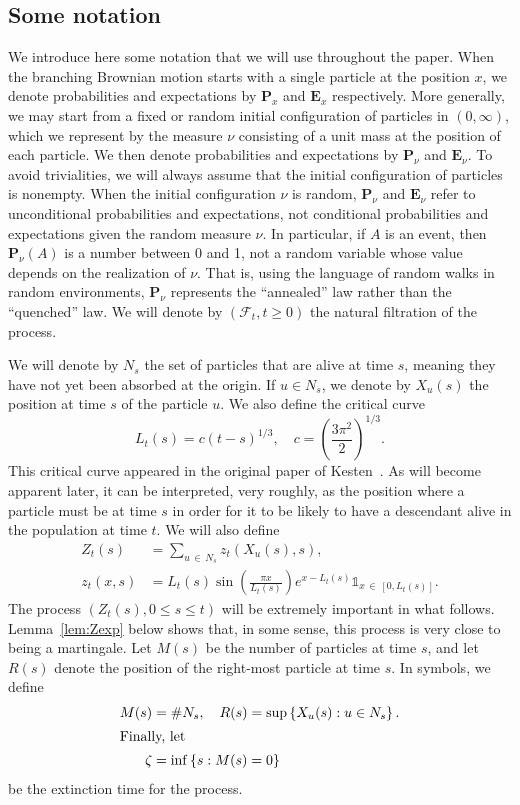 \documentclass[AHL,Unicode,longabstracts,published]{cedram}
\newcommand*\E{\mathbf{E}}
\renewcommand*\P{\mathbf{P}}
\newcommand\F{\mathcal{F}}
\newcommand{\1} {\mathds{1}}
\begin{document}
\subsection{Some notation}

We introduce here some notation that we will use throughout the paper. When the branching Brownian motion starts with a single particle at the position $x$, we denote probabilities and expectations by $\P_x$ and $\E_x$ respectively. More generally, we may start from a fixed or random initial configuration of particles in $(0, \infty)$, which we represent by the measure $\nu$ consisting of a unit mass at the position of each particle. We then denote probabilities and expectations by $\P_{\nu}$ and $\E_{\nu}$. To avoid trivialities, we will always assume that the initial configuration of particles is nonempty. When the initial configuration $\nu$ is random, $\P_{\nu}$ and $\E_{\nu}$ refer to unconditional probabilities and expectations, not conditional probabilities and expectations given the random measure $\nu$. In particular, if $A$ is an event, then $\P_{\nu}(A)$ is a number between 0 and 1, not a random variable whose value depends on the realization of $\nu$. That is, using the language of random walks in random environments, $\P_{\nu}$ represents the ``annealed'' law rather than the ``quenched'' law. We will denote by $(\F_t, t \geq 0)$ the natural filtration of the process.

We will denote by $N_s$ the set of particles that are alive at time $s$, meaning they have not yet been absorbed at the origin. If $u \in N_s$, we denote by $X_u(s)$ the position at time $s$ of the particle $u$. We also define the critical curve
\begin{equation}\label{Lcdef}
L_t(s) = c(t - s)^{1/3}, \quad c = \left(\frac{3 \pi^2}{2} \right)^{1/3}.
\end{equation}
This critical curve appeared in the original paper of Kesten~\cite{kesten}. As will become apparent later, it can be interpreted, very roughly, as the position where a particle must be at time $s$ in order for it to be likely to have a descendant alive in the population at time $t$. We will also define
\begin{equation}\label{Zdef}
\begin{split}
Z_t(s) &= \sum_{u\,\in\,N_s} z_t\left(X_u(s), s\right), \\
z_t(x,s) &= L_t(s) \sin \left(\frac{\pi x}{L_t(s)} \right) e^{x - L_t(s)} \1_{x \,\in\,\left[0, L_t(s)\right]}.
\end{split}
\end{equation}
The process $(Z_t(s), 0 \leq s \leq t)$ will be extremely important in what follows. Lem\-ma~\ref{lem:Zexp} below shows that, in some sense, this process is very close to being a martingale. Let $M(s)$ be the number of particles at time $s$, and let $R(s)$ denote the position of the right-most particle at time $s$. In symbols, we define
\begin{align}
M(s) &= \#N_s, \quad R(s) = \sup\left\{X_u(s): u \in N_s\right\}.\label{MRdef}
\\
\intertext{Finally, let}
\zeta &= \inf\left\{s: M(s) = 0\right\}\nonumber
\end{align}
be the extinction time for the process.
\end{document}
